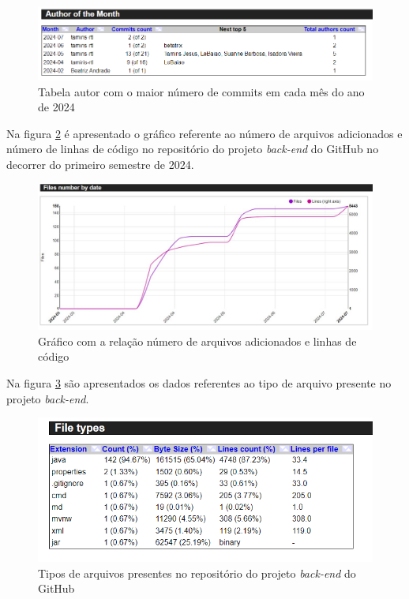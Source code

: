 \begin{figure}[ht]
        \centering
\includegraphics[width=1.0\textwidth]{images/rank-autor-stats-back.png}
        \caption{Tabela autor com o maior número de commits em cada mês do ano de 2024}
        \label{fig:rankingAutoresBack}
    \end{figure}

\newpage

Na figura \ref{fig:arquivosPorDataBack} é apresentado o gráfico referente ao número de arquivos adicionados e número de linhas de código no repositório do projeto \textit{back-end} do GitHub no decorrer do primeiro semestre de 2024.

\begin{figure}[ht]
        \centering
\includegraphics[width=1.0\textwidth]{images/arquivos-por-data-stats-back.jpg}
        \caption{Gráfico com a relação número de arquivos adicionados e linhas de código}
        \label{fig:arquivosPorDataBack}
    \end{figure}


Na figura \ref{fig:tiposdeArquivosBack} são apresentados os dados referentes ao tipo de arquivo presente no projeto \textit{back-end}.

\begin{figure}[ht]
        \centering
\includegraphics[width=1.0\textwidth]{images/tipos-arquivos-stats-back.png}
        \caption{Tipos de arquivos presentes no repositório do projeto \textit{back-end} do GitHub}
        \label{fig:tiposdeArquivosBack}
    \end{figure}

